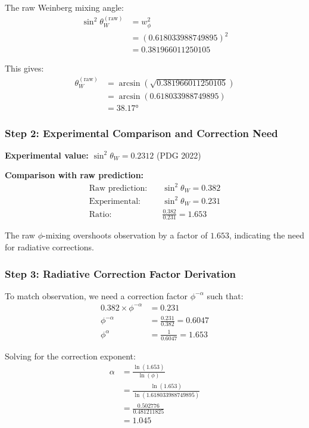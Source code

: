The raw Weinberg mixing angle:
\begin{align}
\sin^2\theta_W^{(\text{raw})} &= w_{\phi}^2\\
&= (0.618033988749895)^2\\
&= 0.381966011250105
\end{align}

This gives:
\begin{align}
\theta_W^{(\text{raw})} &= \arcsin(\sqrt{0.381966011250105})\\
&= \arcsin(0.618033988749895)\\
&= 38.17°
\end{align}

\subsubsection{Step 2: Experimental Comparison and Correction Need}

\textbf{Experimental value:} $\sin^2\theta_W = 0.2312$ (PDG 2022)

\textbf{Comparison with raw prediction:}
\begin{align}
\text{Raw prediction:} \quad &\sin^2\theta_W = 0.382\\
\text{Experimental:} \quad &\sin^2\theta_W = 0.231\\
\text{Ratio:} \quad &\frac{0.382}{0.231} = 1.653
\end{align}

The raw $\phi$-mixing overshoots observation by a factor of $1.653$, indicating the need for radiative corrections.

\subsubsection{Step 3: Radiative Correction Factor Derivation}

To match observation, we need a correction factor $\phi^{-\alpha}$ such that:
\begin{align}
0.382 \times \phi^{-\alpha} &= 0.231\\
\phi^{-\alpha} &= \frac{0.231}{0.382} = 0.6047\\
\phi^{\alpha} &= \frac{1}{0.6047} = 1.653
\end{align}

Solving for the correction exponent:
\begin{align}
\alpha &= \frac{\ln(1.653)}{\ln(\phi)}\\
&= \frac{\ln(1.653)}{\ln(1.618033988749895)}\\
&= \frac{0.502776}{0.481211825}\\
&= 1.045
\end{align}

